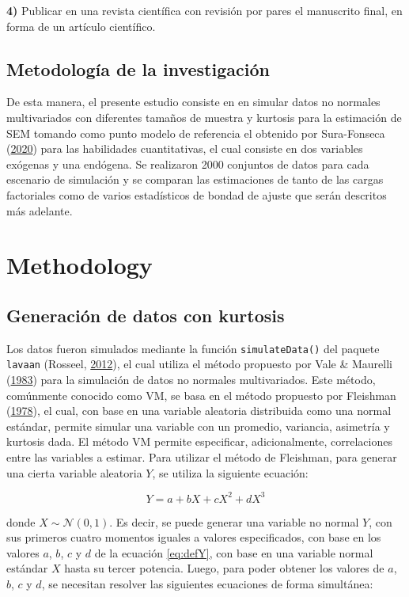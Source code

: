 \documentclass[
  english]{revcoles}
\begin{document}
\textbf{4)} Publicar en una revista científica con revisión por pares el
manuscrito final, en forma de un artículo científico.

\subsection{Metodología de la investigación}

De esta manera, el presente estudio consiste en en simular datos no
normales multivariados con diferentes tamaños de muestra y kurtosis para
la estimación de SEM tomando como punto modelo de referencia el obtenido
por Sura-Fonseca (\protect\hyperlink{ref-SuraFonseca2020}{2020}) para
las habilidades cuantitativas, el cual consiste en dos variables
exógenas y una endógena. Se realizaron 2000 conjuntos de datos para cada
escenario de simulación y se comparan las estimaciones de tanto de las
cargas factoriales como de varios estadísticos de bondad de ajuste que
serán descritos más adelante.

\section{Methodology}

\subsection{Generación de datos con kurtosis}

Los datos fueron simulados mediante la función \texttt{simulateData()}
del paquete \texttt{lavaan} (Rosseel,
\protect\hyperlink{ref-lavaan}{2012}), el cual utiliza el método
propuesto por Vale \& Maurelli (\protect\hyperlink{ref-Vale1983}{1983})
para la simulación de datos no normales multivariados. Este método,
comúnmente conocido como VM, se basa en el método propuesto por
Fleishman (\protect\hyperlink{ref-Fleishman1978}{1978}), el cual, con
base en una variable aleatoria distribuida como una normal estándar,
permite simular una variable con un promedio, variancia, asimetría y
kurtosis dada. El método VM permite especificar, adicionalmente,
correlaciones entre las variables a estimar. Para utilizar el método de
Fleishman, para generar una cierta variable aleatoria \(Y\), se utiliza
la siguiente ecuación:

\begin{equation} \label{eq:defY}
  Y = a + bX + cX^2 + d X^3
\end{equation}

donde \(X \sim \mathcal{N} (0,1)\). Es decir, se puede generar una
variable no normal \(Y\), con sus primeros cuatro momentos iguales a
valores especificados, con base en los valores \(a\), \(b\), \(c\) y
\(d\) de la ecuación \ref{eq:defY}, con base en una variable normal
estándar \(X\) hasta su tercer potencia. Luego, para poder obtener los
valores de \(a\), \(b\), \(c\) y \(d\), se necesitan resolver las
siguientes ecuaciones de forma simultánea:
\end{document}
